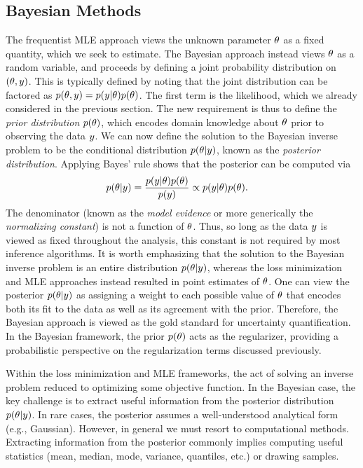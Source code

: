 \documentclass[12pt]{article}
\begin{document}
\subsection{Bayesian Methods}
The frequentist MLE approach views the unknown parameter $\theta$ as a fixed quantity, which we seek to estimate.
The Bayesian approach instead views $\theta$ as a random variable, and proceeds by defining a joint probability 
distribution on $(\theta, y)$. This is typically defined by noting that the joint distribution can be 
factored as $p(\theta, y) = p(y | \theta)p(\theta)$. The first term is the likelihood, which we already considered in 
the previous section. The new requirement is thus to define the \textit{prior distribution} $p(\theta)$, which encodes
domain knowledge about $\theta$ prior to observing the data $y$. We can now define the solution to the Bayesian 
inverse problem to be the conditional distribution $p(\theta | y)$, known as the \textit{posterior distribution}. 
Applying Bayes' rule shows that the posterior can be computed via 
\begin{align}
p(\theta | y) &= \frac{p(y | \theta) p(\theta)}{p(y)} \propto p(y | \theta) p(\theta). 
\end{align}
The denominator (known as the \textit{model evidence} or more generically the \textit{normalizing constant}) is 
not a function of $\theta$. Thus, so long as the data $y$ is viewed as fixed throughout the analysis, this constant 
is not required by most inference algorithms. It is worth emphasizing that the solution to the Bayesian inverse problem 
is an entire distribution $p(\theta | y)$, whereas the loss minimization and MLE approaches instead resulted in point 
estimates of $\theta$. One can view the posterior $p(\theta | y)$ as assigning a weight to each possible value of 
$\theta$ that encodes both its fit to the data as well as its agreement with the prior.  
Therefore, the Bayesian approach is viewed as the gold standard for uncertainty quantification. In the Bayesian framework, 
the prior $p(\theta)$ acts as the regularizer, providing a probabilistic perspective on the regularization terms discussed previously. 

Within the loss minimization and MLE frameworks, the act of solving an inverse problem reduced to optimizing some 
objective function. In the Bayesian case, the key challenge is to extract useful information from the posterior distribution 
$p(\theta | y)$. In rare cases, the posterior assumes a well-understood analytical form (e.g., Gaussian). However, in 
general we must resort to computational methods. Extracting information from the posterior commonly implies
computing useful statistics (mean, median, mode, variance, quantiles, etc.) or drawing samples. 
\end{document}

